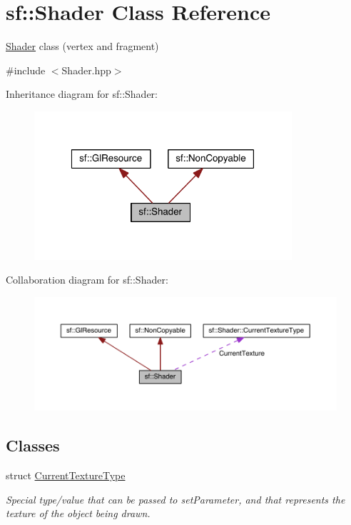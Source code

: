 \hypertarget{classsf_1_1_shader}{\section{sf\-:\-:Shader Class Reference}
\label{classsf_1_1_shader}
}


\hyperlink{classsf_1_1_shader}{Shader} class (vertex and fragment)  




{\ttfamily \#include $<$Shader.\-hpp$>$}



Inheritance diagram for sf\-:\-:Shader\-:
\nopagebreak
\begin{figure}[H]
\begin{center}
\leavevmode
\includegraphics[width=271pt]{classsf_1_1_shader__inherit__graph}
\end{center}
\end{figure}


Collaboration diagram for sf\-:\-:Shader\-:
\nopagebreak
\begin{figure}[H]
\begin{center}
\leavevmode
\includegraphics[width=350pt]{classsf_1_1_shader__coll__graph}
\end{center}
\end{figure}
\subsection*{Classes}
\begin{DoxyCompactItemize}
\item 
struct \hyperlink{structsf_1_1_shader_1_1_current_texture_type}{Current\-Texture\-Type}
\begin{DoxyCompactList}\small\item\em Special type/value that can be passed to set\-Parameter, and that represents the texture of the object being drawn. \end{DoxyCompactList}\end{DoxyCompactItemize}
